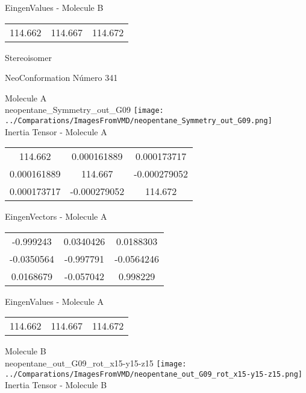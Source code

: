 \begin{multicols}{2}
\begin{center}
\vtab
 EingenValues - Molecule B     \\
\vtab
\begin{tabular}{|c c c|}
114.662	 & 	114.667	 & 	114.672	 \\
\end{tabular}

\end{center}
\end{multicols}
\begin{center}
\vtab
\vtab
\textcolor{NavyBlue}{\Large Stereoisomer}
\end{center}

 \newpage

\vtab[-2cm]
\begin{center}
{\large NeoConformation \tab Número 341}
\end{center}
\begin{multicols}{2}
\begin{center}

Molecule A \\ 
neopentane\_Symmetry\_out\_G09
\texttt{[image: ../Comparations/ImagesFromVMD/neopentane\_Symmetry\_out\_G09.png]}
\\
Inertia Tensor - Molecule A \\
\vtab

\begin{tabular}{|c c c|}
114.662	 & 	0.000161889	 & 	0.000173717	 \\
0.000161889	 & 	114.667	 & 	-0.000279052	 \\
0.000173717	 & 	-0.000279052	 & 	114.672
\end{tabular}

\vtab
 EingenVectors - Molecule A     \\
\vtab
\begin{tabular}{|c c c|}
-0.999243	 & 	0.0340426	 & 	0.0188303	 \\
-0.0350564	 & 	-0.997791	 & 	-0.0564246	 \\
0.0168679	 & 	-0.057042	 & 	0.998229
\end{tabular}

\vtab
 EingenValues - Molecule A     \\
\vtab
\begin{tabular}{|c c c|}
114.662	 & 	114.667	 & 	114.672	 \\
\end{tabular}
\columnbreak

Molecule B \\ 
neopentane\_out\_G09\_rot\_x15-y15-z15
\texttt{[image: ../Comparations/ImagesFromVMD/neopentane\_out\_G09\_rot\_x15-y15-z15.png]}
\\
Inertia Tensor - Molecule B \\
\vtab


\end{center}
\end{multicols}
